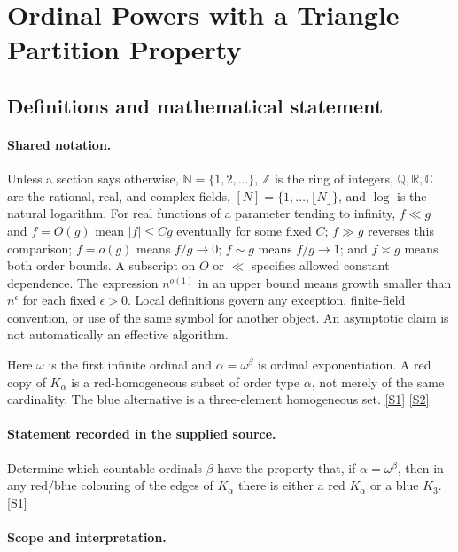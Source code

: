 \documentclass[11pt,a4paper]{article}
\newcommand{\N}{\mathbb{N}}
\newcommand{\Z}{\mathbb{Z}}
\newcommand{\Q}{\mathbb{Q}}
\newcommand{\R}{\mathbb{R}}
\newcommand{\C}{\mathbb{C}}
\newcommand{\sref}[2]{\hyperlink{source:#1:#2}{[S#2]}}
\begin{document}
\section{Ordinal Powers with a Triangle Partition Property}\label{statement}


\subsection{Definitions and mathematical statement}

\paragraph{Shared notation.}Unless a section says otherwise, $\N=\{1,2,\ldots\}$,
$\Z$ is the ring of integers, $\Q,\R,\C$ are the rational, real, and complex
fields, $[N]=\{1,\ldots,\lfloor N\rfloor\}$, and $\log$ is the natural
logarithm. For real functions of a parameter tending to infinity,
$f\ll g$ and $f=O(g)$ mean $|f|\leq Cg$ eventually for some fixed $C$;
$f\gg g$ reverses this comparison; $f=o(g)$ means $f/g\to0$;
$f\sim g$ means $f/g\to1$; and $f\asymp g$ means both order bounds.
A subscript on $O$ or $\ll$ specifies allowed constant dependence.
The expression $n^{o(1)}$ in an upper bound means growth smaller than
$n^\epsilon$ for each fixed $\epsilon>0$. Local definitions govern any
exception, finite-field convention, or use of the same symbol for another
object. An asymptotic claim is not automatically an effective algorithm.



Here $\omega$ is the first infinite ordinal and $\alpha=\omega^\beta$ is ordinal exponentiation. A red copy of $K_\alpha$ is a red-homogeneous subset of order type $\alpha$, not merely of the same cardinality. The blue alternative is a three-element homogeneous set. \sref{statement}{1} \sref{statement}{2}

\paragraph{Statement recorded in the supplied source.}
Determine which countable ordinals $\beta$ have the property that, if $\alpha=\omega^\beta$, then in any red/blue colouring of the edges of $K_\alpha$ there is either a red $K_\alpha$ or a blue $K_3$. \sref{statement}{1}

\paragraph{Scope and interpretation.}
\end{document}
